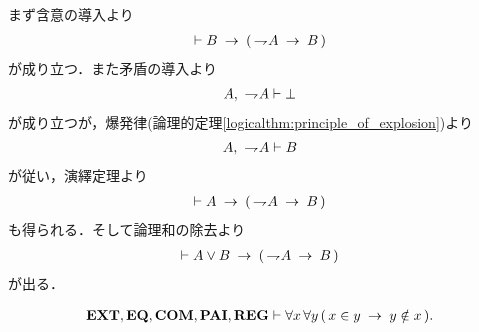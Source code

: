 	\begin{sketch}
		まず含意の導入より
		\begin{align}
			\vdash B \rarrow (\, \negation A \rarrow B\, )
		\end{align}
		が成り立つ．また矛盾の導入より
		\begin{align}
			A,\ \negation A \vdash \bot
		\end{align}
		が成り立つが，爆発律(論理的定理\ref{logicalthm:principle_of_explosion})より
		\begin{align}
			A,\ \negation A \vdash B
		\end{align}
		が従い，演繹定理より
		\begin{align}
			\vdash A \rarrow (\, \negation A \rarrow B\, )
		\end{align}
		も得られる．そして論理和の除去より
		\begin{align}
			\vdash A \vee B \rarrow (\, \negation A \rarrow B\, )
		\end{align}
		が出る．
		\QED
	\end{sketch}
	
	\begin{screen}
		\begin{thm}[集合のどの二組も所属関係で堂々巡りしない]
		\label{thm:no_pair_of_sets_go_round}
			\begin{align}
				\EXTAX,\EQAX,\COMAX,\PAIAX,\REGAX \vdash 
				\forall x\, \forall y\, (\, x \in y \rarrow y \notin x\, ).
			\end{align}
		\end{thm}
	\end{screen}
	
